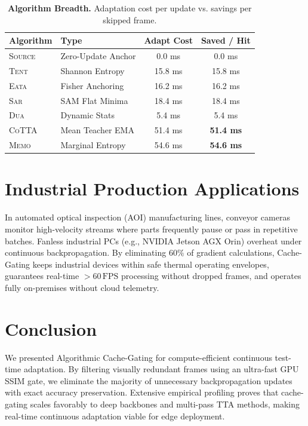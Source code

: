 \documentclass[10pt,twocolumn,letterpaper]{article}
\begin{document}
\begin{table}[h]
\centering
\caption{\textbf{Algorithm Breadth.} Adaptation cost per update vs. savings per skipped frame.}
\label{tab:models}
\small
\begin{tabular}{llcc}
\toprule
\textbf{Algorithm} & \textbf{Type} & \textbf{Adapt Cost} & \textbf{Saved / Hit} \\
\midrule
\textsc{Source} & Zero-Update Anchor & 0.0 ms & 0.0 ms \\
\textsc{Tent}~\cite{wang2021tent} & Shannon Entropy & 15.8 ms & 15.8 ms \\
\textsc{Eata}~\cite{niu2022eata} & Fisher Anchoring & 16.2 ms & 16.2 ms \\
\textsc{Sar}~\cite{niu2023sar} & SAM Flat Minima & 18.4 ms & 18.4 ms \\
\textsc{Dua}~\cite{mirza2022dua} & Dynamic Stats & 5.4 ms & 5.4 ms \\
\textsc{CoTTA}~\cite{wang2022cotta} & Mean Teacher EMA & 51.4 ms & \textbf{51.4 ms} \\
\textsc{Memo}~\cite{zhang2022memo} & Marginal Entropy & 54.6 ms & \textbf{54.6 ms} \\
\bottomrule
\end{tabular}
\end{table}

\section{Industrial Production Applications}
\label{sec:production}
In automated optical inspection (AOI) manufacturing lines, conveyor cameras monitor high-velocity streams where parts frequently pause or pass in repetitive batches. Fanless industrial PCs (e.g., NVIDIA Jetson AGX Orin) overheat under continuous backpropagation. By eliminating $60\%$ of gradient calculations, Cache-Gating keeps industrial devices within safe thermal operating envelopes, guarantees real-time $>60\,\text{FPS}$ processing without dropped frames, and operates fully on-premises without cloud telemetry.

\section{Conclusion}
\label{sec:conclusion}
We presented Algorithmic Cache-Gating for compute-efficient continuous test-time adaptation. By filtering visually redundant frames using an ultra-fast GPU SSIM gate, we eliminate the majority of unnecessary backpropagation updates with exact accuracy preservation. Extensive empirical profiling proves that cache-gating scales favorably to deep backbones and multi-pass TTA methods, making real-time continuous adaptation viable for edge deployment.

{\small


}
\end{document}
